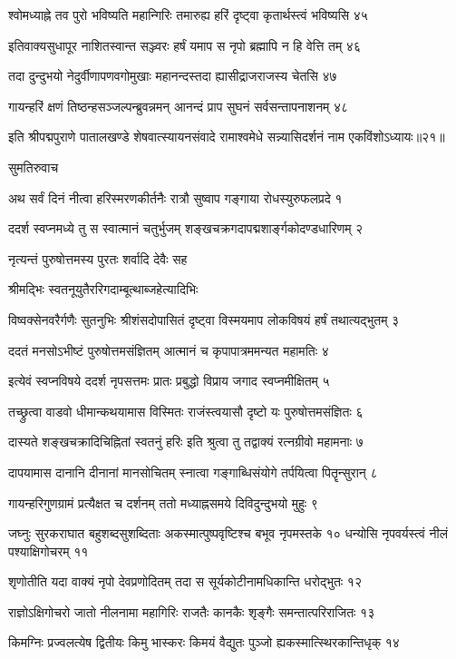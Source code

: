 श्वोमध्याह्ने तव पुरो भविष्यति महान्गिरिः
तमारुह्य हरिं दृष्ट्वा कृतार्थस्त्वं भविष्यसि ४५

इतिवाक्यसुधापूर नाशितस्वान्त सञ्ज्वरः
हर्षं यमाप स नृपो ब्रह्मापि न हि वेत्ति तम् ४६

तदा दुन्दुभयो नेदुर्वीणापणवगोमुखाः
महानन्दस्तदा ह्यासीद्राजराजस्य चेतसि ४७

गायन्हरिं क्षणं तिष्ठन्हसञ्जल्पन्ब्रुवन्नमन्
आनन्दं प्राप सुघनं सर्वसन्तापनाशनम् ४८

इति श्रीपद्मपुराणे पातालखण्डे शेषवात्स्यायनसंवादे रामाश्वमेधे सन्न्यासिदर्शनं नाम एकविंशोऽध्यायः॥२१॥


सुमतिरुवाच

अथ सर्वं दिनं नीत्वा हरिस्मरणकीर्तनैः
रात्रौ सुष्वाप गङ्गाया रोधस्युरुफलप्रदे १

ददर्श स्वप्नमध्ये तु स स्वात्मानं चतुर्भुजम्
शङ्खचक्रगदापद्मशार्ङ्गकोदण्डधारिणम् २

नृत्यन्तं पुरुषोत्तमस्य पुरतः शर्वादि देवैः सह

श्रीमद्भिः स्वतनूयुतैररिगदाम्बूत्थाब्जहेत्यादिभिः

विष्वक्सेनवरैर्गणैः सुतनुभिः श्रीशंसदोपासितं
दृष्ट्वा विस्मयमाप लोकविषयं हर्षं तथात्यद्भुतम् ३

ददतं मनसोऽभीष्टं पुरुषोत्तमसंज्ञितम्
आत्मानं च कृपापात्रममन्यत महामतिः ४

इत्येवं स्वप्नविषये ददर्श नृपसत्तमः
प्रातः प्रबुद्धो विप्राय जगाद स्वप्नमीक्षितम् ५

तच्छ्रुत्वा वाडवो धीमान्कथयामास विस्मितः
राजंस्त्वयासौ दृष्टो यः पुरुषोत्तमसंज्ञितः ६

दास्यते शङ्खचक्रादिचिह्नितां स्वतनुं हरिः
इति श्रुत्वा तु तद्वाक्यं रत्नग्रीवो महामनाः ७

दापयामास दानानि दीनानां मानसोचितम्
स्नात्वा गङ्गाब्धिसंयोगे तर्पयित्वा पितॄन्सुरान् ८

गायन्हरिगुणग्रामं प्रत्यैक्षत च दर्शनम्
ततो मध्याह्नसमये दिविदुन्दुभयो मुहुः ९

जघ्नुः सुरकराघात बहुशब्दसुशब्दिताः
अकस्मात्पुष्पवृष्टिश्च बभूव नृपमस्तके १०
धन्योसि नृपवर्यस्त्वं नीलं पश्याक्षिगोचरम् ११

शृणोतीति यदा वाक्यं नृपो देवप्रणोदितम्
तदा स सूर्यकोटीनामधिकान्ति धरोद्भुतः १२

राज्ञोऽक्षिगोचरो जातो नीलनामा महागिरिः
राजतैः कानकैः शृङ्गैः समन्तात्परिराजितः १३

किमग्निः प्रज्वलत्येष द्वितीयः किमु भास्करः
किमयं वैद्युतः पुञ्जो ह्यकस्मात्स्थिरकान्तिधृक् १४

